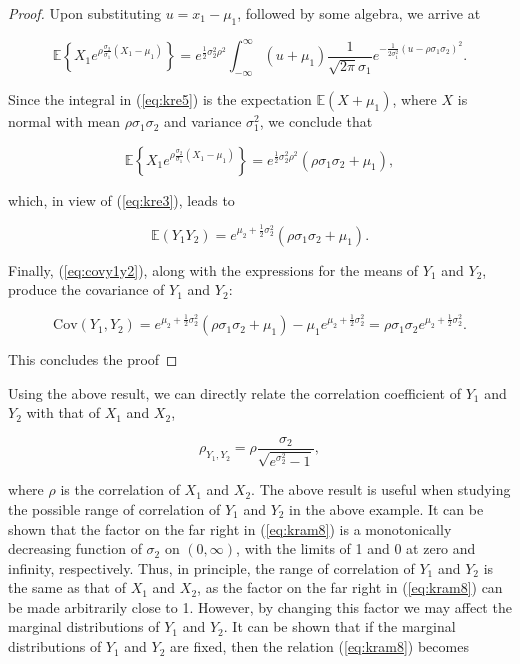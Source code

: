 \documentclass[
]{jss}
\begin{document}
\begin{proof}
Upon substituting $u=x_1-\mu_1$, followed by some algebra, we arrive at 

\begin{equation}
\label{eq:kre5}
\mathbb E \left\{ X_1 e^{ \rho\frac{\sigma_2}{\sigma_1} (X_1-\mu_1)} \right\} = e^{\frac{1}{2}\sigma_2^2\rho^2} \int_{-\infty}^\infty (u+\mu_1)  \frac{1}{\sqrt{2\pi}\sigma_1} e^{-\frac{1}{2\sigma_1^2}(u-\rho\sigma_1\sigma_2)^2}.
\end{equation}

Since the integral in (\ref{eq:kre5}) is the expectation $\mathbb E(X+\mu_1)$, where $X$ is normal with mean $\rho\sigma_1\sigma_2$ and variance $\sigma_1^2$, we conclude that 

\begin{equation}
\label{eq:kre6}
\mathbb E \left\{ X_1 e^{ \rho\frac{\sigma_2}{\sigma_1} (X_1-\mu_1)} \right\} = e^{\frac{1}{2}\sigma_2^2\rho^2} (\rho\sigma_1\sigma_2 +\mu_1),
\end{equation}

which, in view of (\ref{eq:kre3}), leads to 

\begin{equation}
\label{eq:kre7}
\mathbb E (Y_1Y_2) = e^{\mu_2 + \frac{1}{2}\sigma_2^2} (\rho\sigma_1\sigma_2 +\mu_1).
\end{equation}

Finally, (\ref{eq:covy1y2}), along with the expressions for the means of $Y_1$ and $Y_2$, produce the covariance of $Y_1$ and $Y_2$:

\begin{equation}
\label{eq:kre8}
\mbox{Cov}(Y_1, Y_2) = e^{\mu_2 + \frac{1}{2}\sigma_2^2} (\rho\sigma_1\sigma_2 +\mu_1) - \mu_1 e^{\mu_2 + \frac{1}{2}\sigma_2^2} = \rho\sigma_1\sigma_2 e^{\mu_2 + \frac{1}{2}\sigma_2^2}.
\end{equation}

This concludes the proof
\end{proof}

Using the above result, we can directly relate the correlation
coefficient of \(Y_1\) and \(Y_2\) with that of \(X_1\) and \(X_2\),

\begin{equation}
\label{eq:kram8}
\rho_{Y_1, Y_2} = \rho \frac{\sigma_2}{\sqrt{e^{\sigma_2^2} -1}},
\end{equation}

where \(\rho\) is the correlation of \(X_1\) and \(X_2\). The above
result is useful when studying the possible range of correlation of
\(Y_1\) and \(Y_2\) in the above example. It can be shown that the
factor on the far right in (\ref{eq:kram8}) is a monotonically
decreasing function of \(\sigma_2\) on \((0,\infty)\), with the limits
of 1 and 0 at zero and infinity, respectively. Thus, in principle, the
range of correlation of \(Y_1\) and \(Y_2\) is the same as that of
\(X_1\) and \(X_2\), as the factor on the far right in (\ref{eq:kram8})
can be made arbitrarily close to 1. However, by changing this factor we
may affect the marginal distributions of \(Y_1\) and \(Y_2\). It can be
shown that if the marginal distributions of \(Y_1\) and \(Y_2\) are
fixed, then the relation (\ref{eq:kram8}) becomes
\end{document}

